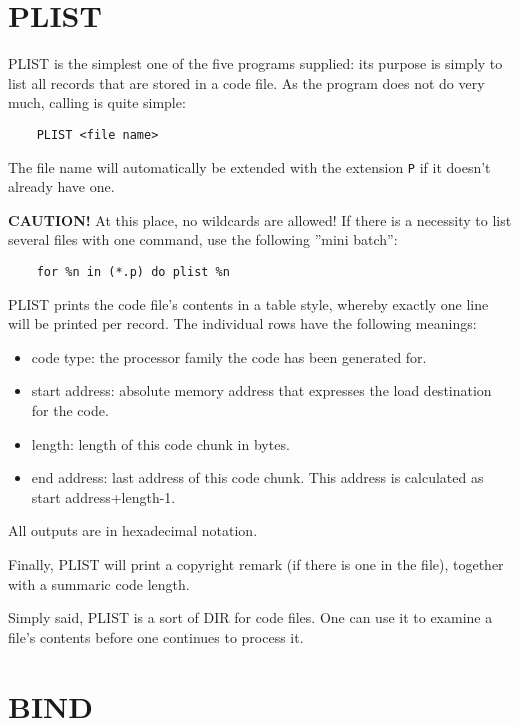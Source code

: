 \documentclass[12pt,twoside]{report}
\newcommand{\bb}[1]{{\bf #1}}
\newcommand{\tty}[1]{{\tt #1}}
\begin{document}

\section{PLIST}

PLIST is the simplest one of the five programs supplied: its purpose
is simply to list all records that are stored in a code file.  As the
program does not do very much, calling is quite simple:
\begin{verbatim}
    PLIST <file name>
\end{verbatim}
The file name will automatically be extended with the extension \tty{P} if
it doesn't already have one.

\bb{CAUTION!} At this place, no wildcards are allowed!  If there is a
necessity to list several files with one command, use the following
''mini batch'':
\begin{verbatim}
    for %n in (*.p) do plist %n
\end{verbatim}
PLIST prints the code file's contents in a table style, whereby
exactly one line will be printed per record.  The individual rows
have the following meanings:
\begin{itemize}
\item{code type: the processor family the code has been generated for.}
\item{start address: absolute memory address that expresses the load
      destination for the code.}
\item{length: length of this code chunk in bytes.}
\item{end address: last address of this code chunk.  This address
      is calculated as start address+length-1.}
\end{itemize}
All outputs are in hexadecimal notation.

Finally, PLIST will print a copyright remark (if there is one in the
file), together with a summaric code length.

Simply said, PLIST is a sort of DIR for code files.  One can use it
to examine a file's contents before one continues to process it.


\section{BIND}
\end{document}

